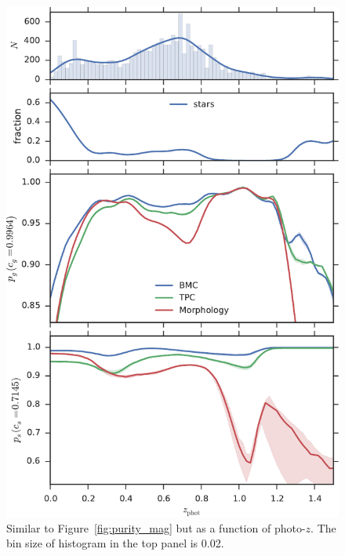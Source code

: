 \documentclass[useAMS,usenatbib]{mn2e}
\begin{document}
\begin{figure}
  \centering
  \includegraphics[width=\columnwidth]{figures/purity_z.pdf}
  \caption{Similar to Figure~\ref{fig:purity_mag}
           but as a function of photo-$z$.
           The bin size of histogram in the top panel is 0.02.}
  \label{fig:purity_z}
\end{figure}
\end{document}
